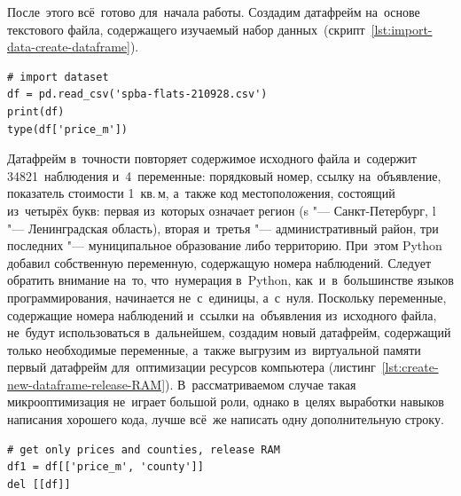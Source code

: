 \documentclass[]{scrreprt}
\begin{document}
После~этого всё~готово для~начала работы. Создадим датафрейм на~основе текстового файла, содержащего изучаемый набор данных~(скрипт~\ref{lst:import-data-create-dataframe}).
%
\begin{lstlisting}[float, caption = Загрузка данных и~создание датафрейма, firstnumber=1, label= lst:import-data-create-dataframe]
# import dataset
df = pd.read_csv('spba-flats-210928.csv')
print(df)
type(df['price_m'])
\end{lstlisting}
%
Датафрейм в~точности повторяет содержимое исходного файла и~содержит 34821~наблюдения и~4~переменные: порядковый номер, ссылку на~объявление, показатель стоимости 1~кв.\,м, а~также код местоположения, состоящий из~четырёх букв: первая из~которых означает регион (s "--- Санкт-Петербург, l "--- Ленинградская область), вторая и~третья "--- административный район, три последних "--- муниципальное образование либо территорию. При~этом \foreignlanguage{english}{Python} добавил собственную переменную, содержащую номера наблюдений. Следует обратить внимание на~то, что~нумерация в~\foreignlanguage{english}{Python}, как~и~в~большинстве языков программирования, начинается не~с~единицы, а~с~нуля. Поскольку переменные, содержащие номера наблюдений и~ссылки на~объявления из~исходного файла, не~будут использоваться в~дальнейшем, создадим новый датафрейм, содержащий только необходимые переменные, а~также выгрузим из~виртуальной памяти первый датафрейм для~оптимизации ресурсов компьютера (листинг~\ref{lst:create-new-dataframe-release-RAM}). В~рассматриваемом случае такая микрооптимизация не~играет большой роли, однако в~целях выработки навыков написания хорошего кода, лучше всё~же написать одну дополнительную строку.
%
\begin{lstlisting}[float, caption = Создание датафрейма\, содержащего только необходимые переменные\, и~выгрузка из~памяти неиспользуемых данных, firstnumber=1, label= lst:create-new-dataframe-release-RAM]
# get only prices and counties, release RAM
df1 = df[['price_m', 'county']]
del [[df]]
\end{lstlisting}
%
\end{document}
